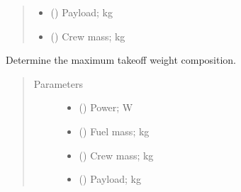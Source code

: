 \documentclass[letterpaper,10pt,english]{sphinxmanual}
\begin{document}
\begin{fulllineitems}
\begin{fulllineitems}
\begin{quote}
\begin{description}
\begin{itemize}
\item {} 
\sphinxAtStartPar
{} () \textendash{} Payload; kg

\item {} 
\sphinxAtStartPar
{} () \textendash{} Crew mass; kg

\end{itemize}

\end{description}\end{quote}

\end{fulllineitems}


\begin{fulllineitems}
\label{\detokenize{modules/helicopter:helicopter.Helicopter.mass_estimation}}
\sphinxAtStartPar
Determine the maximum take\sphinxhyphen{}off weight composition.
\begin{quote}\begin{description}
\item[{Parameters}] \leavevmode\begin{itemize}
\item {} 
\sphinxAtStartPar
{} () \textendash{} Power; W

\item {} 
\sphinxAtStartPar
{} () \textendash{} Fuel mass; kg

\item {} 
\sphinxAtStartPar
{} () \textendash{} Crew mass; kg

\item {} 
\sphinxAtStartPar
{} () \textendash{} Payload; kg


\end{itemize}
\end{description}
\end{quote}
\end{fulllineitems}
\end{fulllineitems}
\end{document}
